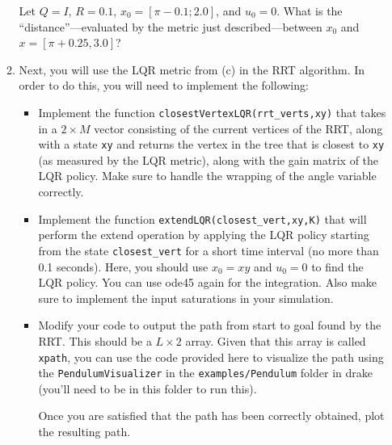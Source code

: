 \documentclass[11pt,letterpaper]{article}
\begin{document}
\begin{enumerate}
\begin{enumerate}
Let $Q=I$, $R=0.1$, $x_0=[\pi-0.1;2.0]$, and $u_0=0$. What is the ``distance''---evaluated by the metric just described---between $x_0$ and $x=[\pi+0.25,3.0]$?

\item Next, you will use the LQR metric from (c) in the RRT algorithm. In order to do this, you will need to implement the following:

\begin{itemize}
	\item Implement the function {\tt closestVertexLQR(rrt\_verts,xy)} that takes in a $2\times M$ vector consisting of the current vertices of the RRT, along with a state {\tt xy} and returns the vertex in the tree that is closest to {\tt xy} (as measured by the LQR metric), along with the gain matrix of the LQR policy. Make sure to handle the wrapping of the angle variable correctly.

\item Implement the function {\tt extendLQR(closest\_vert,xy,K)} that will perform the extend operation by applying the LQR policy starting from the state {\tt closest\_vert} for a short time interval (no more than 0.1 seconds). Here, you should use $x_0=xy$ and  $u_0=0$ to find the LQR policy. You can use ode45 again for the integration. Also make sure to implement the input saturations in your simulation.
 
\item Modify your code to output the path from start to goal found by the RRT. This should be a $L\times 2$ array. Given that this array is called {\tt xpath}, you can use the code provided here to visualize the path using the {\tt PendulumVisualizer} in the {\tt examples/Pendulum} folder in drake (you'll need to be in this folder to run this). 
	
Once you are satisfied that the path has been correctly obtained, plot the resulting path. 

\end{itemize}

\end{enumerate}

\end{enumerate}
\end{document}

